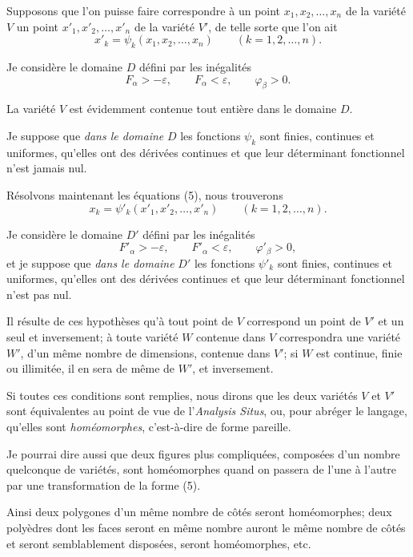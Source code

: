 \documentclass{article}
\begin{document}
Supposons que l'on puisse faire correspondre à un point $x_{1}, x_{2}, \ldots, x_{n}$ de la variété $V$ un point $x'_{1}, x'_{2}, \ldots, x'_{n}$ de la variété $V'$, de telle sorte que l'on ait
\[
x'_{k} = \psi_{k}(x_{1}, x_{2}, \ldots, x_{n}) \qquad (k = 1, 2, \ldots, n).
\tag{5}
\]

Je considère le domaine $D$ défini par les inégalités
\[
F_{\alpha} > -\varepsilon, \qquad F_{\alpha} < \varepsilon, \qquad \varphi_{\beta} > 0.
\]

La variété $V$ est évidemment contenue tout entière dans le domaine $D$.

Je suppose que \emph{dans le domaine} $D$ les fonctions $\psi_{k}$ sont finies, continues et uniformes, qu'elles ont des dérivées continues et que leur déterminant fonctionnel n'est jamais nul.

Résolvons maintenant les équations (5), nous trouverons
\[
x_{k} = \psi'_{k}(x'_{1}, x'_{2}, \ldots, x'_{n}) \qquad (k = 1, 2, \ldots, n).
\tag{6}
\]

Je considère le domaine $D'$ défini par les inégalités
\[
F'_{\alpha} > -\varepsilon, \qquad F'_{\alpha} < \varepsilon, \qquad \varphi'_{\beta} > 0,
\]
et je suppose que \emph{dans le domaine} $D'$ les fonctions $\psi'_{k}$ sont finies, continues et uniformes, qu'elles ont des dérivées continues et que leur déterminant fonctionnel n'est pas nul.

Il résulte de ces hypothèses qu'à tout point de $V$ correspond un point de $V'$ et un seul et inversement; à toute variété $W$ contenue dans $V$ correspondra une variété $W'$, d'un même nombre de dimensions, contenue dans $V'$; si $W$ est continue, finie ou illimitée, il en sera de même de $W'$, et inversement.

Si toutes ces conditions sont remplies, nous dirons que les deux variétés $V$ et $V'$ sont équivalentes au point de vue de l'\emph{Analysis Situs}, ou, pour abréger le langage, qu'elles sont \emph{homéomorphes}, c'est-à-dire de forme pareille.

Je pourrai dire aussi que deux figures plus compliquées, composées d'un nombre quelconque de variétés, sont homéomorphes quand on passera de l'une à l'autre par une transformation de la forme (5).

Ainsi deux polygones d'un même nombre de côtés seront homéomorphes; deux polyèdres dont les faces seront en même nombre auront le même nombre de côtés et seront semblablement disposées, seront homéomorphes, etc.
\end{document}
